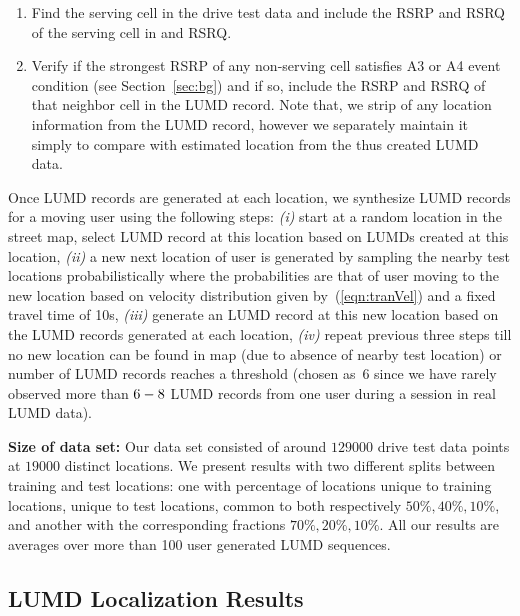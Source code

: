 \documentclass[conference, 10pt]{IEEEtran}
\begin{document}
\begin{enumerate}
	
\item Find the serving cell in the drive test data and include the RSRP
and RSRQ of the serving cell in and RSRQ.

\item  Verify if the strongest RSRP of any non-serving cell satisfies A3 or A4 event
condition (see Section~\ref{sec:bg}) and if so, include the RSRP and RSRQ of
that neighbor cell in the LUMD record. Note that, we strip of any location
information from the LUMD record, however we separately maintain it simply to
compare with estimated location from the thus created LUMD data. 

\end{enumerate}

Once LUMD records are generated at each location, we synthesize LUMD records for a
moving user using the following steps: {\em (i)} start at a random location in the
street map, select LUMD record at this location based on LUMDs created at this
location, {\em (ii)} a new next location of user is generated by sampling the nearby
test locations probabilistically where the probabilities are that of user moving to
the new location based on velocity distribution given by~(\ref{eqn:tranVel}) and a fixed
travel time of 10s, {\em (iii)}  generate an LUMD record at this new location based
on the LUMD records generated at each location, {\em (iv)} repeat previous three
steps till no new location can be found in map (due to absence of nearby test
location) or number of LUMD records reaches a threshold (chosen as~6 since we have
rarely observed more than $6\--8$ LUMD records from one user during a session in real
LUMD data).

{\bf Size of data set:} Our data set consisted of around $129000$ drive test data
points at $19000$ distinct locations. We present results with two different splits
between training and test locations: one with percentage of locations unique to
training locations, unique to test locations, common to both respectively  $50\%,
40\%, 10\%$, and another with the corresponding fractions $70\%,20\%,10\%$. All our
results are averages over more than 100 user generated LUMD sequences.

\subsection{LUMD Localization Results}
\end{document}
